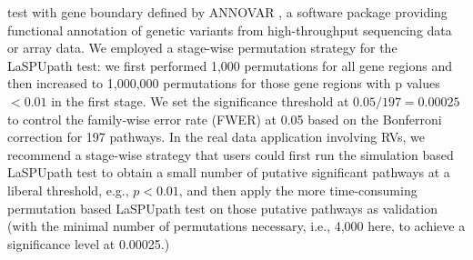 \documentclass[12pt]{article}
\begin{document}
test with gene boundary defined by ANNOVAR \cite{Wang2010a}, a software package providing functional annotation of genetic variants from high-throughput sequencing data or array data.
We employed a stage-wise permutation strategy for the LaSPUpath test: we first performed 1,000 permutations for all gene regions and then increased to 1,000,000 permutations for those gene regions with p values $< 0.01$ in the first stage. We set the significance threshold at $0.05/197 = 0.00025$ to control the family-wise error rate (FWER) at 0.05 based on the Bonferroni correction for 197 pathways. In the real data application involving RVs, we recommend a stage-wise strategy that users could first run the simulation based LaSPUpath test to obtain a small number of putative significant pathways at a liberal threshold, e.g., $p < 0.01$, and then apply the more time-consuming permutation based LaSPUpath test on those putative pathways as validation (with the minimal number of permutations necessary, i.e., 4,000 here, to achieve a significance level at 0.00025.)
\end{document}
